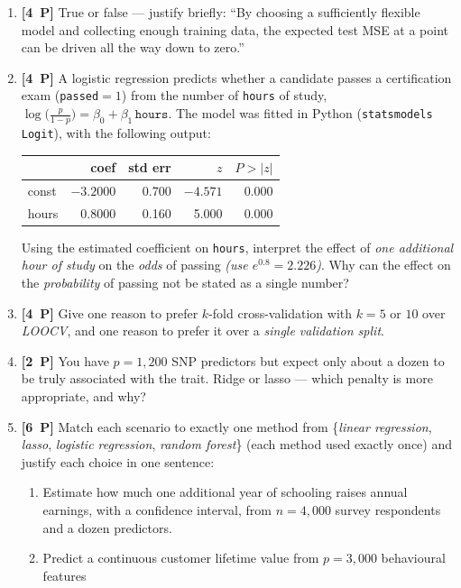 \documentclass[11pt,a4paper]{article}
\newcommand{\pp}[1]{\textbf{[#1~P]}\enspace}
\begin{document}
\begin{enumerate}[label=(\alph*),leftmargin=7mm,itemsep=2.5mm]
  \item \pp{4} True or false --- justify briefly: ``By choosing a sufficiently flexible model
    and collecting enough training data, the expected test MSE at a point can be driven all the
    way down to zero.''
  \item \pp{4} A logistic regression predicts whether a candidate passes a certification exam
    (\texttt{passed}$=1$) from the number of \texttt{hours} of study,
    $\log\bigl(\frac{p}{1-p}\bigr)=\beta_0+\beta_1\,\texttt{hours}$. The model was fitted in
    Python (\texttt{statsmodels} \texttt{Logit}), with the following output:
    \begin{center}
    \begin{tabular}{lrrrr}
    \toprule
     & coef & std err & $z$ & $P>|z|$\\
    \midrule
    const & $-3.2000$ & 0.700 & $-4.571$ & 0.000\\
    hours &  0.8000 & 0.160 & 5.000 & 0.000\\
    \bottomrule
    \end{tabular}
    \end{center}
    Using the estimated coefficient on \texttt{hours}, interpret the effect of \emph{one
    additional hour of study} on the \emph{odds} of passing \emph{(use $e^{0.8}=2.226$)}. Why
    can the effect on the \emph{probability} of passing not be stated as a single number?
  \item \pp{4} Give one reason to prefer $k$-fold cross-validation with $k=5$ or $10$ over
    \emph{LOOCV}, and one reason to prefer it over a \emph{single validation split}.
  \item \pp{2} You have $p=1{,}200$ SNP predictors but expect only about a dozen to be truly
    associated with the trait. Ridge or lasso --- which penalty is more appropriate, and why?
  \item \pp{6} Match each scenario to exactly one method from
    \{\emph{linear regression}, \emph{lasso}, \emph{logistic regression},
    \emph{random forest}\} (each method used exactly once) and justify each choice in one
    sentence:
    \begin{enumerate}[label=(\roman*),nosep,topsep=1mm]
      \item Estimate how much one additional year of schooling raises annual earnings, with a
        confidence interval, from $n=4{,}000$ survey respondents and a dozen predictors.
      \item Predict a continuous customer lifetime value from $p=3{,}000$ behavioural features

\end{enumerate}
\end{enumerate}
\end{document}
